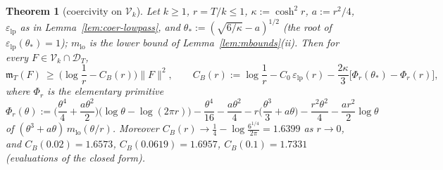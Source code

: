 \documentclass[11pt]{amsart}
\newtheorem{theorem}{Theorem}[section]
\theoremstyle{definition}
\theoremstyle{remark}
\newcommand{\mT}{\mathfrak m_T}
\begin{document}
\begin{theorem}[coercivity on $\mathcal V_k$]\label{thm:coer-B}
Let $k\ge1$, $r=T/k\le1$, $\kappa:=\cosh^2r$, $a:=r^2/4$, $\varepsilon_{\mathrm{lp}}$ as in
Lemma~\ref{lem:coer-lowpass}, and $\theta_*:=(\sqrt{6/\kappa}-a)^{1/2}$ (the root of $\varepsilon_{\mathrm{lp}}(\theta_*)=1$); $m_{\mathrm{lo}}$ is
the lower bound of Lemma~\ref{lem:mbounds}(ii).
Then for every $F\in\mathcal V_k\cap\mathcal D_T$,
\begin{equation}\label{eq:coer-B}
\mT(F)\ \ge\ \Big(\log\frac1r-C_B(r)\Big)\|F\|^2,\qquad
C_B(r):=\log\frac1r-C_0\,\varepsilon_{\mathrm{lp}}(r)-\frac{2\kappa}3\big[\Phi_r(\theta_*)-\Phi_r(r)\big],
\end{equation}
where $\Phi_r$ is the elementary primitive
\[
\Phi_r(\theta):=\Big(\frac{\theta^4}4+\frac{a\theta^2}2\Big)\big(\log\theta-\log(2\pi r)\big)-\frac{\theta^4}{16}-\frac{a\theta^2}4
-r\Big(\frac{\theta^3}3+a\theta\Big)-\frac{r^2\theta^2}4-\frac{ar^2}2\log\theta
\]
of $(\theta^3+a\theta)\,m_{\mathrm{lo}}(\theta/r)$. Moreover $C_B(r)\to\frac14-\log\frac{6^{1/4}}{2\pi}=1.6399$ as
$r\to0$, and $C_B(0.02)=1.6573$, $C_B(0.0619)=1.6957$, $C_B(0.1)=1.7331$ (evaluations of the closed form).
\end{theorem}
\end{document}
